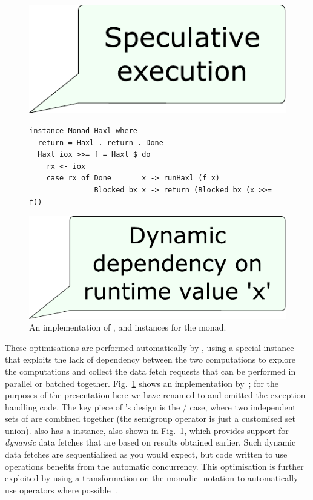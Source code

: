 \begin{figure}
\vspace{11.5mm}\hspace{110.5mm}\includegraphics[scale=0.32]{fig/comment-haxl-selective-2.pdf}
\vspace{-7.5mm}
\begin{verbatim}
instance Monad Haxl where
  return = Haxl . return . Done
  Haxl iox >>= f = Haxl $ do
    rx <- iox
    case rx of Done       x -> runHaxl (f x)
               Blocked bx x -> return (Blocked bx (x >>= f))
\end{verbatim}
\vspace{-19mm}\hspace{31mm}\includegraphics[scale=0.32]{fig/comment-haxl-monad.pdf}
\vspace{5mm}
\caption{An implementation of ,  and 
instances for the \Haxl monad.}
\label{fig-haxl}
\vspace{-3mm}
\end{figure}

These optimisations are performed automatically by \Haxl, using a
special  instance that exploits the lack of
dependency between the two computations to explore the computations
and collect the data fetch requests that can be performed in
parallel or batched together. Fig.~\ref{fig-haxl} shows an implementation
by~\citet{marlow2014haxl}; for the purposes of the presentation here
we have renamed  to  and omitted the exception-handling code.
The key piece of \Haxl's design is the / case, where
two independent sets of  are combined together (the
semigroup operator \hs{<>} is just a customised set union). \Haxl also has a
 instance, also shown in Fig.~\ref{fig-haxl}, which provides support
for \emph{dynamic} data fetches that are based on results obtained earlier.
Such dynamic data fetches are sequentialised as you would expect, but code
written to use  operations benefits from the automatic
concurrency. This optimisation is further exploited by using a transformation
on the monadic -notation to automatically use 
operators where possible~\cite{marlow2016applicativedo}.

